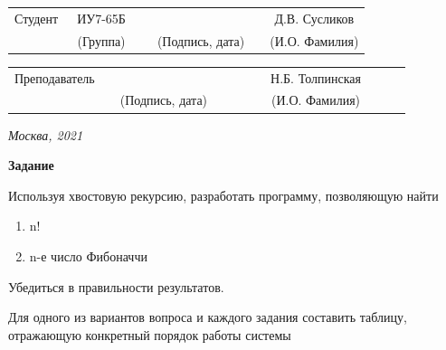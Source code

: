 \documentclass[12pt, a4paper]{extarticle}
\begin{document}
\noindent
{}
\\

\noindent
{}
\\

\vspace{1.5cm}
\noindent
\begin{tabular}{l c c c c c}
	Студент      & ~ИУ7-65Б~               & \hspace{2.5cm} & \hspace{2cm}                 & &  Д.В. Сусликов \\\cline{2-2}\cline{4-4} \cline{6-6} 
	\hspace{3cm} & {\footnotesize(Группа)} &                & {\footnotesize(Подпись, дата)} & & {\footnotesize(И.О. Фамилия)}
\end{tabular}

\noindent
\begin{tabular}{l c c c c}
	Преподаватель & \hspace{5cm}   & \hspace{2cm}                 & & ~~~~~~Н.Б. Толпинская~~~~~~\\\cline{3-3} \cline{5-5} 
	\hspace{3cm}  &                & {\footnotesize(Подпись, дата)} & & {\footnotesize(И.О. Фамилия)}
\end{tabular}

\vspace{0.6cm}
\begin{center}	
	\vfill
	\large \textit {Москва, 2021}
\end{center}

\thispagestyle {empty}
\pagebreak

\clearpage

\textbf{Задание}

Используя хвостовую рекурсию, разработать программу, позволяющую найти 

\begin{enumerate}
	\item n!
	\item n-е число Фибоначчи
\end{enumerate}

Убедиться в правильности результатов.

Для одного из вариантов вопроса и каждого задания составить таблицу, отражающую конкретный порядок работы системы
\end{document}
